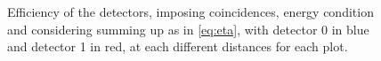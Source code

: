 \begin{figure}[H]
\begin{minipage}[c]{0.35\linewidth}
	\end{minipage}
	\caption{Efficiency of the detectors, imposing coincidences, energy condition and considering summing up as in \ref{eq:eta}, with detector 0 in blue and detector 1 in red, at each different distances for each plot.}
    \label{fig:eff_all3}
	\end{figure}

     




